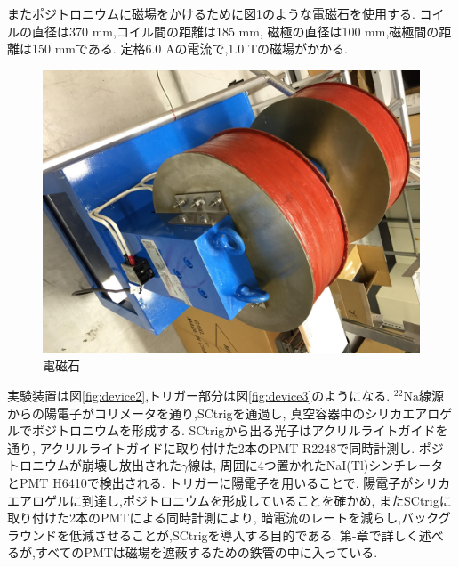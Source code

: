 またポジトロニウムに磁場をかけるために図\ref{fig:mag}のような電磁石を使用する.
コイルの直径は370 mm,コイル間の距離は185 mm,
磁極の直径は100 mm,磁極間の距離は150 mmである.
定格6.0 Aの電流で,1.0 Tの磁場がかかる.

\begin{figure}[H]
\centering
\includegraphics[keepaspectratio,angle=90,scale=0.4]{fig/ybm/mag.pdf}
\caption{電磁石}
\label{fig:mag}
\end{figure}

実験装置は図\ref{fig:device2},トリガー部分は図\ref{fig:device3}のようになる.
$\mathrm{^{22}Na}$線源からの陽電子がコリメータを通り,SCtrigを通過し,
真空容器中のシリカエアロゲルでポジトロニウムを形成する.
SCtrigから出る光子はアクリルライトガイドを通り,
アクリルライトガイドに取り付けた2本のPMT R2248で同時計測し.
ポジトロニウムが崩壊し放出された$\gamma$線は,
周囲に4つ置かれたNaI(Tl)シンチレータとPMT H6410で検出される.
トリガーに陽電子を用いることで,
陽電子がシリカエアロゲルに到達し,ポジトロニウムを形成していることを確かめ,
またSCtrigに取り付けた2本のPMTによる同時計測により,
暗電流のレートを減らし,バックグラウンドを低減させることが,SCtrigを導入する目的である.
第-章で詳しく述べるが,すべてのPMTは磁場を遮蔽するための鉄管の中に入っている.

